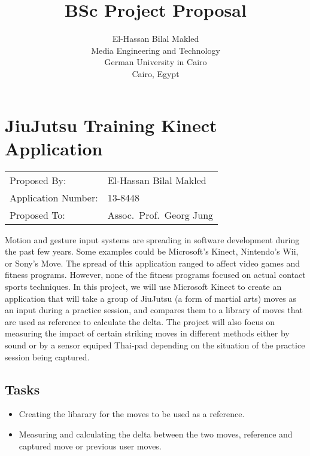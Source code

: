 \documentclass[11pt]{article} %
\title{BSc Project Proposal}
\author{El-Hassan Bilal Makled\\Media Engineering and Technology\\ German University in Cairo\\ Cairo, Egypt}
\begin{document}
\maketitle

\section*{JiuJutsu Training Kinect Application}

\begin{tabular}{@{} l l}
  Proposed By: & El-Hassan Bilal Makled \\
  Application Number: & 13-8448 \\
  Proposed To: & Assoc.\ Prof.\ Georg Jung
\end{tabular}

\vspace*{\baselineskip}

Motion and gesture input systems are spreading in software development during the past few years. Some examples could be Microsoft's Kinect, Nintendo's Wii, or Sony's Move. 
The spread of this application ranged to affect video games and fitness programs. However, none of the fitness programs focused on actual contact sports techniques. 
In this project, we will use Microsoft Kinect to create an application that will take a group of JiuJutsu (a form of martial arts) moves as an input during a practice session, 
and compares them to a library of moves that are used as reference to calculate the delta. 
The project will also focus on measuring the impact of certain striking moves in different 
methods either by sound or by a sensor equiped Thai-pad depending on the situation of the practice session being captured.  

\subsection*{Tasks}
\begin{itemize}
\item Creating the libarary for the moves to be used as a reference.
\item Measuring and calculating the delta between the two moves, reference and captured move or previous user moves.
\end{itemize}
\end{document}
